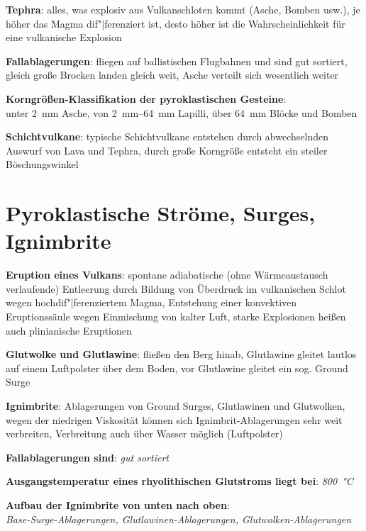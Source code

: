 \textbf{Tephra}:
alles, was explosiv aus Vulkanschloten kommt (Asche, Bomben usw.),
je höher das Magma dif"|ferenziert ist, desto höher ist die Wahrscheinlichkeit für eine
vulkanische Explosion

\textbf{Fallablagerungen}:
fliegen auf ballistischen Flugbahnen und sind gut sortiert,
gleich große Brocken landen gleich weit,
Asche verteilt sich wesentlich weiter

\textbf{Korngrößen-Klassifikation der pyroklastischen Gesteine}:\\
unter \SI{2}{\milli\meter} Asche,
von \SIrange{2}{64}{\milli\meter} Lapilli,
über \SI{64}{\milli\meter} Blöcke und Bomben

\textbf{Schichtvulkane}:
typische Schichtvulkane entstehen durch abwechselnden Auswurf von Lava und Tephra,
durch große Korngröße entsteht ein steiler Böschungswinkel

\pagebreak

\section{%
    Pyroklastische Ströme, Surges, Ignimbrite%
}

\textbf{Eruption eines Vulkans}:
spontane adiabatische (ohne Wärmeaustausch verlaufende) Entleerung durch
Bildung von Überdruck im vulkanischen Schlot wegen hochdif"|ferenziertem Magma,
Entstehung einer konvektiven Eruptionssäule wegen Einmischung von kalter Luft,
starke Explosionen heißen auch plinianische Eruptionen

\textbf{Glutwolke und Glutlawine}:
fließen den Berg hinab,
Glutlawine gleitet lautlos auf einem Luftpolster über dem Boden,
vor Glutlawine gleitet ein sog. Ground Surge

\textbf{Ignimbrite}:
Ablagerungen von Ground Surges, Glutlawinen und Glutwolken,
wegen der niedrigen Viskosität können sich Ignimbrit-Ablagerungen sehr weit verbreiten,
Verbreitung auch über Wasser möglich (Luftpolster)

\begin{wichtig}
    \item
    \textbf{Fallablagerungen sind}:
    \emph{gut sortiert}

    \item
    \textbf{Ausgangstemperatur eines rhyolithischen Glutstroms liegt bei}:
    \emph{\SI[math-rm=\mathit,text-rm=\itshape]{800}{\celsius}}

    \item
    \textbf{Aufbau der Ignimbrite von unten nach oben}:\\
    \emph{Base-Surge-Ablagerungen, Glutlawinen-Ablagerungen, Glutwolken-Ablagerungen}
\end{wichtig}

